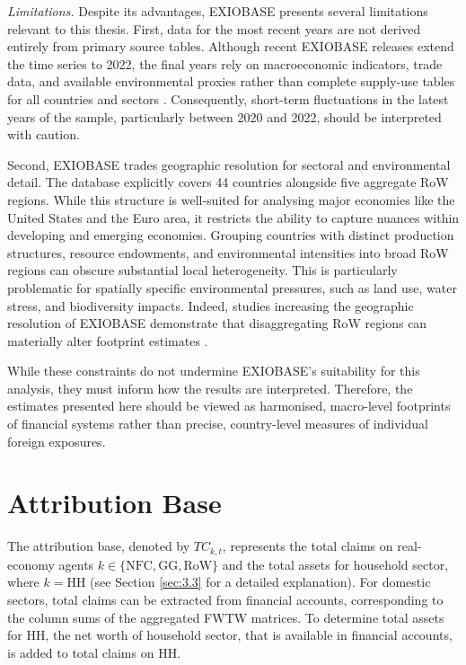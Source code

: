 \textit{Limitations.} Despite its advantages, EXIOBASE presents several limitations relevant to this thesis. First, data for the most recent years are not derived entirely from primary source tables. Although recent EXIOBASE releases extend the time series to 2022, the final years rely on macroeconomic indicators, trade data, and available environmental proxies rather than complete supply-use tables for all countries and sectors \citep{stadler_exiobase_2018}. Consequently, short-term fluctuations in the latest years of the sample, particularly between 2020 and 2022, should be interpreted with caution.

Second, EXIOBASE trades geographic resolution for sectoral and environmental detail. The database explicitly covers 44 countries alongside five aggregate RoW regions. While this structure is well-suited for analysing major economies like the United States and the Euro area, it restricts the ability to capture nuances within developing and emerging economies. Grouping countries with distinct production structures, resource endowments, and environmental intensities into broad RoW regions can obscure substantial local heterogeneity. This is particularly problematic for spatially specific environmental pressures, such as land use, water stress, and biodiversity impacts. Indeed, studies increasing the geographic resolution of EXIOBASE demonstrate that disaggregating RoW regions can materially alter footprint estimates \citep{bjelle_adding_2020, cabernard_highly_2021}.

While these constraints do not undermine EXIOBASE's suitability for this analysis, they must inform how the results are interpreted. Therefore, the estimates presented here should be viewed as harmonised, macro-level footprints of financial systems rather than precise, country-level measures of individual foreign exposures.
\section{Attribution Base}

The attribution base, denoted by $TC_{k,t}$, represents the total claims on real-economy agents $k \in \{\text{NFC}, \text{GG}, \text{RoW}\}$ and the total assets for household sector, where $k = \text{HH}$ (see Section \ref{sec:3.3} for a detailed explanation). For domestic sectors, total claims can be extracted from financial accounts, corresponding to the column sums of the aggregated FWTW matrices. To determine total assets for HH, the net worth of household sector, that is available in financial accounts, is added to total claims on HH. 

